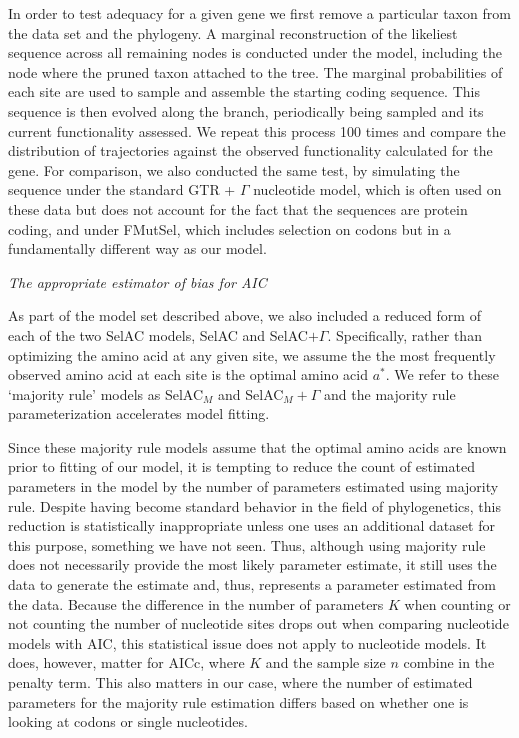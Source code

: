 \documentclass[12pt,letterpaper,fleqn]{article}
\renewcommand{\subsection}[1]{%
\bigskip
\begin{center}
\begin{large}
\normalfont\itshape #1
\end{large}
\end{center}}
\newcommand{\selac}{SelAC\xspace}
\newcommand{\selacplusgamma}{SelAC$+\Gamma$\xspace}
\newcommand{\selacmaj}{SelAC$_{M}$\xspace}
\newcommand{\selacmajplusgamma}{SelAC$_{M}+\Gamma$\xspace}
\newcommand{\aopt}{\ensuremath{a^*}\xspace}
\begin{document}
In order to test adequacy for a given gene we first remove a particular taxon from the data set and the phylogeny.
A marginal reconstruction of the likeliest sequence across all remaining nodes is conducted under the model, including the node where the pruned taxon attached to the tree.
The marginal probabilities of each site are used to sample and assemble the starting coding sequence.
This sequence is then evolved along the branch, periodically being sampled and its current functionality assessed.
We repeat this process 100 times and compare the distribution of trajectories against the observed functionality calculated for the gene.
For comparison, we also conducted the same test, by simulating the sequence under the standard GTR + $\Gamma$ nucleotide model, which is often used on these data but does not account for the fact that the sequences are protein coding, and under FMutSel, which includes selection on codons but in a fundamentally different way as our model.

\subsection{The appropriate estimator of bias for AIC}
As part of the model set described above, we also included a reduced form of each of the two \selac models, \selac and \selacplusgamma.
Specifically, rather than optimizing the amino acid at any given site, we assume the  the most frequently observed amino acid at each site is the optimal amino acid \aopt.
We refer to these `majority rule' models as \selacmaj and \selacmajplusgamma and the majority rule parameterization accelerates model fitting.

Since these majority rule models assume that the optimal amino acids are known prior to fitting of our model, it is tempting to reduce the count of estimated parameters in the model by the number of parameters estimated using majority rule.
Despite having become standard behavior in the field of phylogenetics, this reduction is statistically inappropriate unless one uses an additional dataset for this purpose, something we have not seen.
Thus, although using majority rule does not necessarily provide the most likely parameter estimate, it still uses the data to generate the estimate and, thus, represents a parameter estimated from the data.
Because the difference in the number of parameters $K$ when counting or not counting the number of nucleotide sites drops out when comparing nucleotide models with AIC, this statistical issue does not apply to nucleotide models.
It does, however, matter for AICc, where $K$ and the sample size $n$ combine in the penalty term.
This also matters in our case, where the number of estimated parameters for the majority rule estimation differs based on whether one is looking at codons or single nucleotides.
\end{document}
